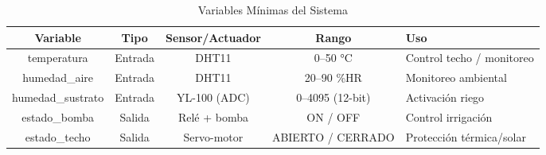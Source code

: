 \begin{table}[tp]
\centering
\renewcommand{\arraystretch}{1.3}
\caption{Variables Mínimas del Sistema}
\label{tab:variables_sistema}
\begin{tabularx}{\textwidth}{|c|c|c|c|X|}
\hline
\textbf{Variable} & \textbf{Tipo} & \textbf{Sensor/Actuador} & \textbf{Rango} & \textbf{Uso} \\
\hline
temperatura & Entrada & DHT11 & 0--50 °C & Control techo / monitoreo \\
\hline
humedad\_aire & Entrada & DHT11 & 20--90 \%HR & Monitoreo ambiental \\
\hline
humedad\_sustrato & Entrada & YL-100 (ADC) & 0--4095 (12-bit) & Activación riego \\
\hline
estado\_bomba & Salida & Relé + bomba & ON / OFF & Control irrigación \\
\hline
estado\_techo & Salida & Servo-motor & ABIERTO / CERRADO & Protección térmica/solar \\
\hline
\end{tabularx}
\end{table}
